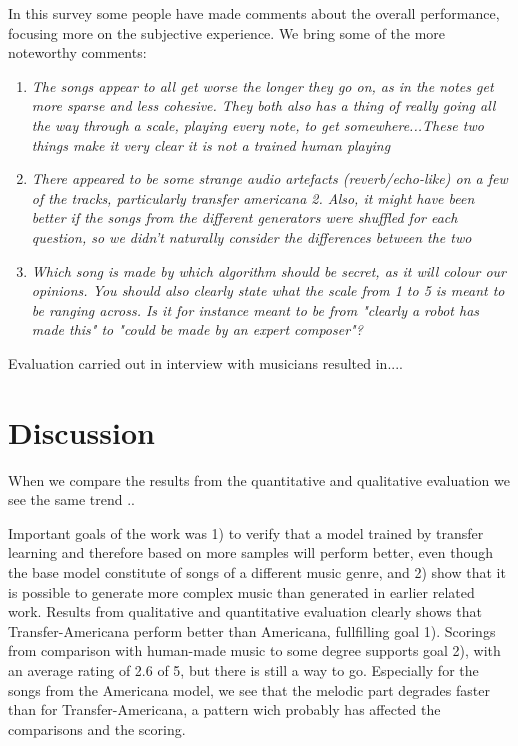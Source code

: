 \documentclass{IEEEtran}
\begin{document}
        In this survey some people have made comments about the overall performance, focusing more on the subjective experience. We bring some of the more noteworthy comments:
        \begin{enumerate}
            \item \emph{The songs appear to all get worse the longer they go on, as in the notes get more sparse and less cohesive. They both also has a thing of really going all the way through a scale, playing every note, to get somewhere...These two things make it very clear it is not a trained human playing}
            \item \emph{There appeared to be some strange audio artefacts (reverb/echo-like) on a few of the tracks, particularly transfer americana 2.
            Also, it might have been better if the songs from the different generators were shuffled for each question, so we didn't naturally consider the differences between the two}
            \item \emph{Which song is made by which algorithm should be secret, as it will colour our opinions. You should also clearly state what the scale from 1 to 5 is meant to be ranging across. Is it for instance meant to be from "clearly a robot has made this" to "could be made by an expert composer"?}
        \end{enumerate}

        Evaluation carried out in interview with musicians resulted in.... %

    \section{Discussion}
    When we compare the results from the quantitative and qualitative evaluation we see the same trend ..

    Important goals of the work was 1) to verify that a model trained by transfer learning and therefore based on more samples will perform better, even though the base model constitute of songs of a different music genre, and 2) show that it is possible to generate more complex music than generated in earlier related work. Results from qualitative and quantitative evaluation clearly shows that Transfer-Americana perform better than Americana, fullfilling goal 1). Scorings from comparison with human-made music to some degree supports goal 2), with an average rating of 2.6 of 5, but there is still a way to go. Especially for the songs from the Americana model, we see that the melodic part degrades faster than for Transfer-Americana, a pattern wich probably has affected the comparisons and the scoring.
\end{document}

